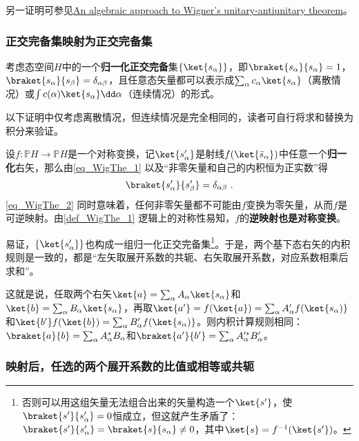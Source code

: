 另一证明可参见\href{https://arxiv.org/abs/math/9808033}{An algebraic approach to Wigner's unitary-antiunitary theorem}。

\subsubsection{正交完备集映射为正交完备集}

考虑态空间$H$中的一个\textbf{归一化正交完备}集$\{\ket{s_\alpha}\}$，即$\braket{s_\alpha}{s_\alpha}=1$，$\braket{s_\alpha}{s_\beta}=\delta_{\alpha\beta}$，且任意态矢量都可以表示成$\sum_\alpha c_\alpha\ket{s_\alpha}$（离散情况）或$\int c(\alpha)\ket{s_\alpha}\dd \alpha$（连续情况）的形式。

以下证明中仅考虑离散情况，但连续情况是完全相同的，读者可自行将求和替换为积分来验证。

设$f:\mathbb{P}H\to\mathbb{P}H$是一个对称变换，记$\ket{s'_\alpha}$是射线$f(\ket{\bar{s}_\alpha})$中任意一个\textbf{归一化}右矢，那么由\autoref{eq_WigThe_1} 以及“非零矢量和自己的内积恒为正实数”得
\begin{equation}\label{eq_WigThe_2}
\braket{s'_\alpha}{s'_\beta} = \delta_{\alpha\beta}~.
\end{equation}
\autoref{eq_WigThe_2} 同时意味着，任何非零矢量都不可能由$f$变换为零矢量，从而$f$是可逆映射。由\autoref{def_WigThe_1} 逻辑上的对称性易知，$f$的\textbf{逆映射也是对称变换}。

易证，$\{\ket{s'_\alpha}\}$也构成一组归一化正交完备集\footnote{否则可以用这组矢量无法组合出来的矢量构造一个$\ket{s'}$，使$\braket{s'}{s'_\alpha}=0$恒成立，但这就产生矛盾了：$\braket{s'}{s'_\alpha}=\braket{s}{s_\alpha}\neq 0$，其中$\ket{s}=f^{-1}(\ket{s'})$。}。于是，两个基下态右矢的内积规则是一致的，都是“左矢取展开系数的共轭、右矢取展开系数，对应系数相乘后求和”。

这就是说，任取两个右矢$\ket{a}=\sum_\alpha A_\alpha\ket{s_\alpha}$和$\ket{b}=\sum_\alpha B_\alpha\ket{s_\alpha}$，再取$\ket{a'}=f(\ket{a}) = \sum_\alpha A'_\alpha f(\ket{s_\alpha)}$和$\ket{b'}f(\ket{b}) = \sum_\alpha B'_\alpha f(\ket{s_\alpha)}$。则内积计算规则相同：$\braket{a}{b}=\sum_\alpha A^*_\alpha B_\alpha$和$\braket{a'}{b'}=\sum_\alpha A'^*_\alpha B'_\alpha$。

\subsubsection{映射后，任选的两个展开系数的比值或相等或共轭}



